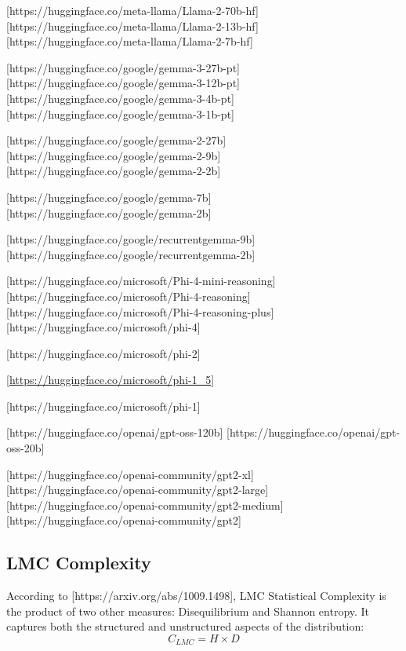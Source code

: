 \begin{enumerate}

        [https://huggingface.co/meta-llama/Llama-2-70b-hf]
        [https://huggingface.co/meta-llama/Llama-2-13b-hf]
        [https://huggingface.co/meta-llama/Llama-2-7b-hf]


        [https://huggingface.co/google/gemma-3-27b-pt]
        [https://huggingface.co/google/gemma-3-12b-pt]
        [https://huggingface.co/google/gemma-3-4b-pt]
        [https://huggingface.co/google/gemma-3-1b-pt]

        [https://huggingface.co/google/gemma-2-27b]
        [https://huggingface.co/google/gemma-2-9b]
        [https://huggingface.co/google/gemma-2-2b]

        [https://huggingface.co/google/gemma-7b]
        [https://huggingface.co/google/gemma-2b]

        [https://huggingface.co/google/recurrentgemma-9b]
        [https://huggingface.co/google/recurrentgemma-2b]


        [https://huggingface.co/microsoft/Phi-4-mini-reasoning]
        [https://huggingface.co/microsoft/Phi-4-reasoning]
        [https://huggingface.co/microsoft/Phi-4-reasoning-plus]
        [https://huggingface.co/microsoft/phi-4]

        [https://huggingface.co/microsoft/phi-2]

        [\url{https://huggingface.co/microsoft/phi-1_5}]

        [https://huggingface.co/microsoft/phi-1]


        [https://huggingface.co/openai/gpt-oss-120b]
        [https://huggingface.co/openai/gpt-oss-20b]

        [https://huggingface.co/openai-community/gpt2-xl]
        [https://huggingface.co/openai-community/gpt2-large]
        [https://huggingface.co/openai-community/gpt2-medium]
        [https://huggingface.co/openai-community/gpt2]


\end{enumerate}



\subsection{LMC Complexity}

    According to [https://arxiv.org/abs/1009.1498], LMC Statistical Complexity is the product of two other measures: Disequilibrium and Shannon entropy. It captures both the structured and unstructured aspects of the distribution:
    \[ C_{LMC} = H \times D \]

